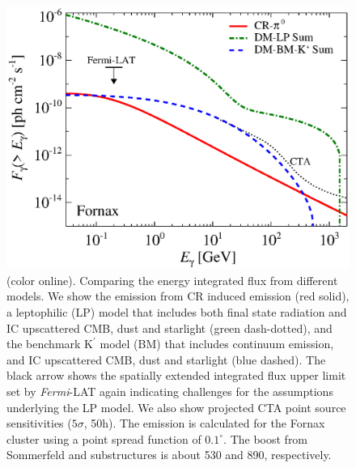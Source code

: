 \documentclass[10pt,aps,pra,reprint,amsmath,amsfonts,amssymb,showpacs,nofootinbib,floatfix]{revtex4-1}
\newcommand{\Fermi}{{\em Fermi}\xspace}
\newcommand{\rmn}{\mathrm}
\newcommand{\Kp}{\rmn{K}^\prime}
\newcommand{\degs}{^\circ}
\newcommand{\colo}{(color online). }
\begin{document}
\begin{figure}
 \includegraphics[width=0.99\columnwidth]{figures/flux.int.v14.0.1deg.1.6T.SubMass.SF700.IR2.noMW.woGal.eps}
 \caption{\colo Comparing the energy integrated flux from
   different models. We show the emission from CR induced emission
   (red solid), a leptophilic (LP) model that includes both final
   state radiation and IC upscattered CMB, dust and starlight (green
   dash-dotted), and the benchmark $\Kp$ model (BM) that includes
   continuum emission, and IC upscattered CMB, dust and starlight
   (blue dashed). The black arrow shows the spatially extended
   integrated flux upper limit set by \Fermi-LAT again indicating
   challenges for the assumptions underlying the LP model. We also
   show projected CTA point source sensitivities ($5\sigma$, 50h). The
   emission is calculated for the Fornax cluster using a point spread
   function of $0.1\degs$. The boost from Sommerfeld and substructures
   is about 530 and 890, respectively.}
 \label{fig:flux_int}
\end{figure}
\end{document}
